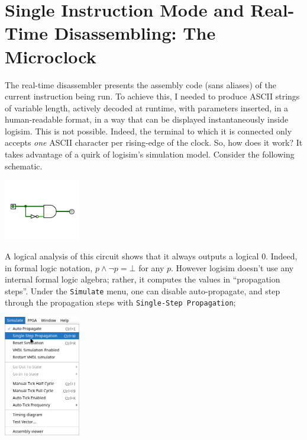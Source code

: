\documentclass{article}
\begin{document}
\section{Single Instruction Mode and Real-Time Disassembling: The Microclock}

The real-time disassembler presents the assembly code (sans aliases) of the current instruction being run. To achieve this, I needed to produce ASCII strings of variable length, actively decoded at runtime, with parameters inserted, in a human-readable format, in a way that can be displayed instantaneously inside logisim. This is not possible. Indeed, the terminal to which it is connected only accepts \textit{one} ASCII character per rising-edge of the clock. So, how does it work? It takes advantage of a quirk of logisim's simulation model. Consider the following schematic.

	\begin{center}\includegraphics[width=0.25\textwidth]{images/and_not.png}\end{center}

A logical analysis of this circuit shows that it always outputs a logical 0. Indeed, in formal logic notation, $p \land \neg p = \bot$ for any $p$. However logisim doesn't use any internal formal logic algebra; rather, it computes the values in ``propagation steps''. Under the \Verb|Simulate| menu, one can disable auto-propagate, and step through the propagation steps with \Verb|Single-Step Propagation|;

	\begin{center}\includegraphics[width=0.25\textwidth]{images/single_step.png}\end{center}
\end{document}
